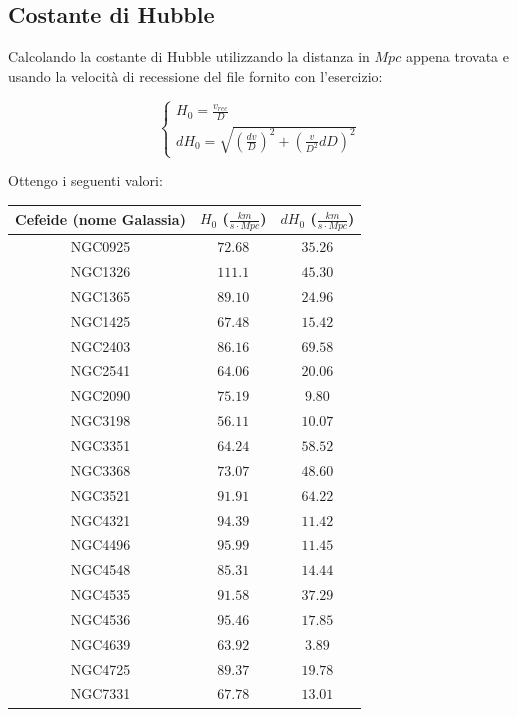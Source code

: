 \documentclass{article}
\begin{document}
\subsection{Costante di Hubble}

Calcolando la costante di Hubble utilizzando la distanza in $Mpc$
appena trovata e usando la velocità di recessione del file fornito con
l'esercizio:

\begin{equation}
  \begin{cases}
    H_0 = \frac{v_{rec}}{D} \\
    dH_0 = \sqrt{ \left ( \frac{dv}{D} \right )^2 + \left (
        \frac{v}{D^2} dD \right ) ^2}
    \end{cases}
  \end{equation}

  Ottengo i seguenti valori:

  \begin{center}
  \begin{tabular}{ccc}
  \toprule
  Cefeide (nome Galassia) & $H_0$ ($\frac{km}{s\cdot Mpc}$) & $dH_0$
                                                             ($\frac{km}{s
                                                             \cdot Mpc}$)
    \\
  \midrule
    NGC0925 & $72.68$ & $35.26$ \\
    NGC1326 & $111.1$ & $45.30$ \\
    NGC1365 & $89.10$ & $24.96$ \\
    NGC1425 & $67.48$ & $15.42$ \\
    NGC2403 & $86.16$ & $69.58$ \\
    NGC2541 & $64.06$ & $20.06$ \\
    NGC2090 & $75.19$ & $9.80$ \\
    NGC3198 & $56.11$ & $10.07$ \\
    NGC3351 & $64.24$ & $58.52$ \\
    NGC3368 & $73.07$ & $48.60$ \\
    NGC3521 & $91.91$ & $64.22$ \\
    NGC4321 & $94.39$ & $11.42$ \\
    NGC4496 & $95.99$ & $11.45$ \\
    NGC4548 & $85.31$ & $14.44$ \\
    NGC4535 & $91.58$ & $37.29$ \\
    NGC4536 & $95.46$ & $17.85$ \\
    NGC4639 & $63.92$ & $3.89$ \\
    NGC4725 & $89.37$ & $19.78$ \\
    NGC7331 & $67.78$ & $13.01$ \\
  \bottomrule
 \end{tabular}
\end{center}
\end{document}
